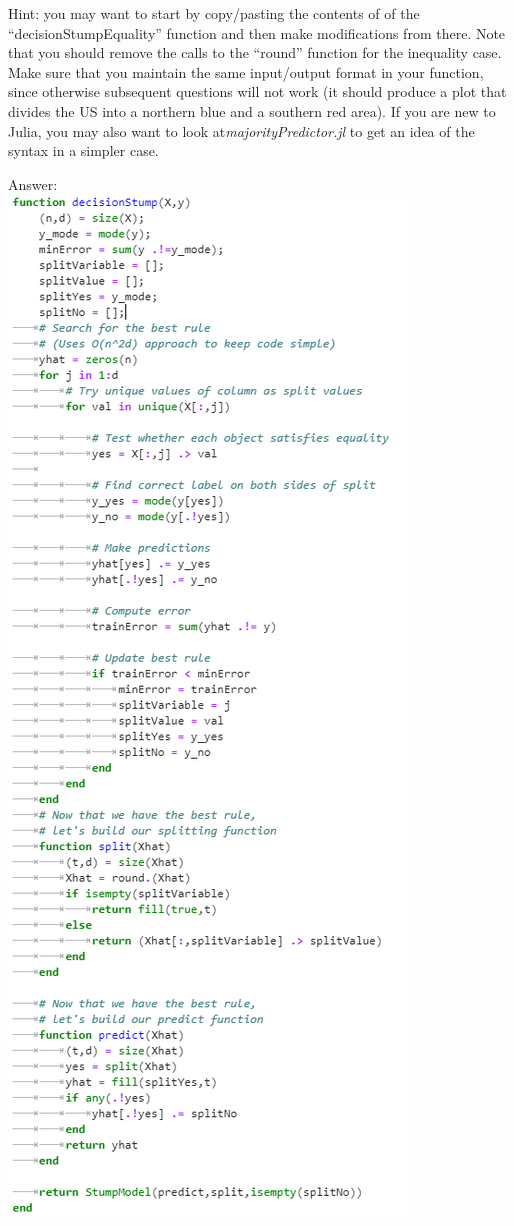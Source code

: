 \documentclass{article}
\def\ans#1{\par\gre{Answer: #1}}
\def\gre#1{{\color{gre}#1}}
\begin{document}
Hint: you may want to start by copy/pasting the contents of of the ``decisionStumpEquality'' function and then make modifications from there. Note that you should remove the calls to the ``round'' function for the inequality case.  Make sure that you maintain the same input/output format in your function, since otherwise subsequent questions will not work (it should produce a plot that divides the US into a northern blue and a southern red area).
If you are new to Julia, you may also want to look at\emph{majorityPredictor.jl} to get an idea of the syntax in  a simpler case.
\ans{\\ 
\includegraphics{DecStump.PNG}
}
\end{document}
